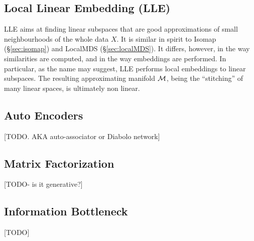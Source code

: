 \subsection{Local Linear Embedding (LLE)}
\label{sec:lle}


LLE aims at finding linear subspaces that are good approximations of small neighbourhoods of the whole data $X$.
It is similar in spirit to Isomap (\S\ref{sec:isomap}) and LocalMDS (\S\ref{sec:localMDS}).
It differs, however, in the way similarities are computed, and in the way embeddings are performed. 
In particular, as the name may suggest, LLE performs local embeddings to linear subspaces. The resulting approximating manifold $\mathcal{M}$, being the ``stitching'' of many linear spaces, is ultimately non linear.




\subsection{Auto Encoders}
\label{sec:auto_encoders}
[TODO. AKA auto-associator or Diabolo network]



\subsection{Matrix Factorization}
\label{sec:matrix_factorization}
[TODO- is it generative?]



\subsection{Information Bottleneck}
[TODO]

%
%
%


